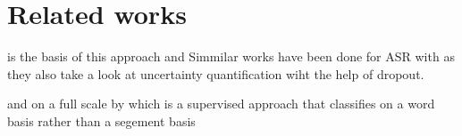 
\chapter{Related works}
\label{ch:relatecworks}
\cite{fomicheva2020unsupervised} is the basis of this approach and 
Simmilar works have been done for ASR with \cite{8683086} as they also take a look at uncertainty quantification wiht the help of dropout. 

\cite{negri-etal-2014-quality}

and on a full scale by 
\cite{le2016automatic} which is a supervised approach that classifies on a word basis rather than a segement basis
